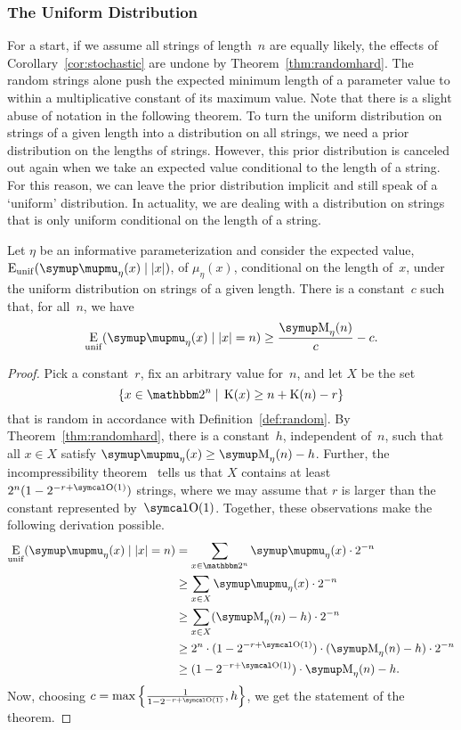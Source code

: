 \subsubsection{The Uniform Distribution}
For a start, if we assume all strings of length~$n$ are equally likely, the effects of Corollary~\ref{cor:stochastic} are undone by Theorem~\ref{thm:randomhard}.
The random strings alone push the expected minimum length of a parameter value to within a multiplicative constant of its maximum value.
Note that there is a slight abuse of notation in the following theorem.
To turn the uniform distribution on strings of a given length into a distribution on all strings, we need a prior distribution on the lengths of strings.
However, this prior distribution is canceled out again when we take an expected value conditional to the length of a string.
For this reason, we can leave the prior distribution implicit and still speak of a `uniform' distribution.
In actuality, we are dealing with a distribution on strings that is only uniform conditional on the length of a string.
\begin{theorem}
\label{thm:expected_uniform}%
  Let $\eta$ be an informative parameterization and consider the expected value, $\Ex_\mathrm{unif}(\mu_\eta(x) \given \length{x})$, of $\mu_\eta(x)$, conditional on the length of~$x$, under the uniform distribution on strings of a given length.
  There is a constant~$c$ such that, for all~$n$, we have
  \begin{equation*}
    \Ex_\mathrm{unif}(\mu_\eta(x) \given \length{x} = n) \ge \frac{\upM_\eta(n)}{c} - c.
  \end{equation*}
\end{theorem}
\begin{proof}
  Pick a constant~$r$, fix an arbitrary value for~$n$, and let $X$ be the set
  \begin{equation*}
    \{x \in \binary^n \st \KC(x) \ge n + \KC(n) - r\}
  \end{equation*}
  that is random in accordance with Definition~\ref{def:random}.
  By Theorem~\ref{thm:randomhard}, there is a constant~$h$, independent of~$n$, such that all $x \in X$ satisfy $\mu_\eta(x) \ge \upM_\eta(n) - h$.
  Further, the incompressibility theorem~\parencite{li2008introduction} tells us that $X$ contains at least $2^n(1 - 2^{-r + \bigO(1)})$ strings, where we may assume that $r$ is larger than the constant represented by~$\bigO(1)$.
  Together, these observations make the following derivation possible.
  \begin{align*}
    \Ex_\mathrm{unif}(\mu_\eta(x) \given \length{x} = n) &= \sum_{x \in \binary^n} \mu_\eta(x) \cdot 2^{-n} \\
      &\ge \sum_{x \in X} \mu_\eta(x) \cdot 2^{-n} \\
      &\ge \sum_{x \in X} (\upM_\eta(n) - h) \cdot 2^{-n} \\
      &\ge 2^n \cdot (1 - 2^{-r + \bigO(1)}) \cdot (\upM_\eta(n) - h) \cdot 2^{-n} \\
      &\ge (1 - 2^{-r + \bigO(1)}) \cdot \upM_\eta(n) - h.
  \end{align*}
  Now, choosing $c = \max\left\{\frac{1}{1 - 2^{-r + \bigO(1)}}, h\right\}$, we get the statement of the theorem.
\end{proof}

